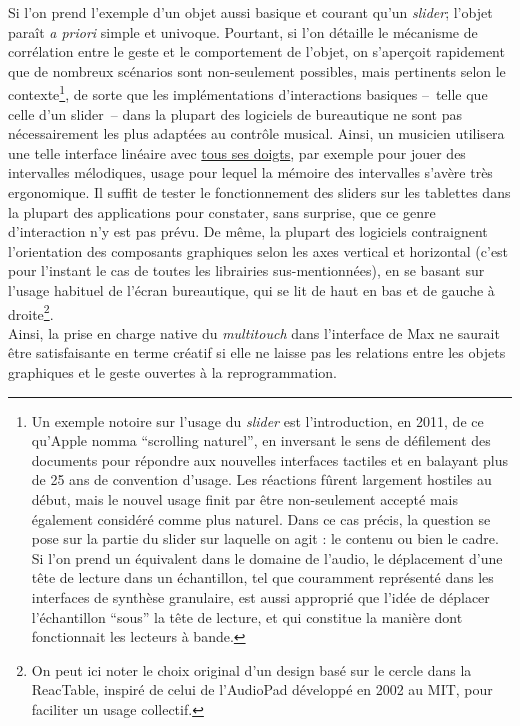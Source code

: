 \indent Si l'on prend l'exemple d'un objet aussi basique et courant qu'un \textit{slider}; l'objet paraît \textit{a priori} simple et univoque. Pourtant, si l'on détaille le mécanisme de corrélation entre le geste et le comportement de l'objet, on s'aperçoit rapidement que de nombreux scénarios sont non-seulement possibles, mais pertinents selon le contexte\footnote{Un exemple notoire sur l'usage du \textit{slider} est l'introduction, en 2011, de ce qu'Apple nomma ``scrolling naturel'', en inversant le sens de défilement des documents pour répondre aux nouvelles interfaces tactiles et en balayant plus de 25 ans de convention d'usage. Les réactions fûrent largement hostiles au début, mais le nouvel usage finit par être non-seulement accepté mais également considéré comme plus naturel. Dans ce cas précis, la question se pose sur la partie du slider sur laquelle on agit : le contenu ou bien le cadre. Si l'on prend un équivalent dans le domaine de l'audio, le déplacement d'une tête de lecture dans un échantillon, tel que couramment représenté dans les interfaces de synthèse granulaire, est aussi approprié que l'idée de déplacer l'échantillon ``sous'' la tête de lecture, et qui constitue la manière dont fonctionnait les lecteurs à bande.}, de sorte que les implémentations d'interactions basiques --~telle que celle d'un slider~-- dans la plupart des logiciels de bureautique ne sont pas nécessairement les plus adaptées au contrôle musical. Ainsi, un musicien utilisera une telle interface linéaire avec \underline{tous ses doigts}, par exemple pour jouer des intervalles mélodiques, usage pour lequel la mémoire des intervalles s'avère très ergonomique. Il suffit de tester le fonctionnement des sliders sur les tablettes dans la plupart des applications pour constater, sans surprise, que ce genre d'interaction n'y est pas prévu. De même, la plupart des logiciels contraignent l'orientation des composants graphiques selon les axes vertical et horizontal (c'est pour l'instant le cas de toutes les librairies sus-mentionnées), en se basant sur l'usage habituel de l'écran bureautique, qui se lit de haut en bas et de gauche à droite\footnote{On peut ici noter le choix original d'un design basé sur le cercle dans la ReacTable, inspiré de celui de l'AudioPad développé en 2002 au \gls{MIT}, pour faciliter un usage collectif.}.\\
\indent Ainsi, la prise en charge native du \textit{multitouch} dans l'interface de Max ne saurait être satisfaisante en terme créatif si elle ne laisse pas les relations entre les objets graphiques et le geste ouvertes à la reprogrammation. 

